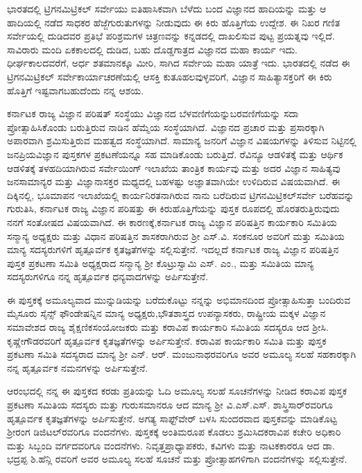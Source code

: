 ಭಾರತದಲ್ಲಿ ಟ್ರಿಗನಮಿಟ್ರಿಕಲ್​ ಸರ್ವೇಯು ಐತಿಹಾಸಿಕವಾಗಿ ಬೆಳೆದು ಬಂದ ವಿಜ್ಞಾನದ ಹಾದಿಯನ್ನು ಮತ್ತು ಆ ಹಾದಿಯಲ್ಲಿ ನಡೆದ ಸಾಧಕರ ಹೆಜ್ಜೆಗುರುತುಗಳನ್ನು ನೀಡುವುದು ಈ ಕಿರು ಹೊತ್ತಿಗೆಯ ಉದ್ದೇಶ. ಈ ನಿಖರ ಗಣಿತ ಸರ್ವೇಯಲ್ಲಿ ದುಡಿದವರ ಪ್ರತಿಭೆ ಪರಿಶ್ರಮಗಳ ಚಿತ್ರಣವನ್ನು ಕನ್ನಡದಲ್ಲಿ ದಾಖಲಿಸುವ ಪುಟ್ಟ ಪ್ರಯತ್ನವು ಇಲ್ಲಿದೆ. ಸಾವಿರಾರು ಮಂದಿ ಏಕಕಾಲದಲ್ಲಿ ದುಡಿದ, ಬಹು ದೊಡ್ಡಗಾತ್ರದ ವಿಜ್ಞಾನದ ಮಹಾ ಕಾರ್ಯ ಇದು. ಧೀರ್ಘ\-ಕಾಲದವರೆಗೆ, ಅರ್ಧ ಶತಮಾನಕ್ಕೂ ಮೀರಿ, ಸಾಗಿದ ಸರ್ವೇಯ ಮಹಾ ಯಾತ್ರೆ ಇದು. ಭಾರತದಲ್ಲಿ ನಡೆದ ಈ ಟ್ರಿಗನಮಿಟ್ರಿಕಲ್​ ಸರ್ವೇಕಾರ್ಯಾಚರಣೆಯಲ್ಲಿ ಆಸಕ್ತಿ ಕುತೂಹಲವುಳ್ಳವರಿಗೆ, ವಿಜ್ಞಾನ ಸಾಹಿತ್ಯಾಸಕ್ತರಿಗೆ ಈ ಕಿರು ಹೊತ್ತಿಗೆ ಇಷ್ಟವಾಗಬಹುದೆಂದು ನನ್ನ ಆಶಯ. 

ಕರ್ನಾಟಕ ರಾಜ್ಯ ವಿಜ್ಞಾನ ಪರಿಷತ್​ ಸಂಸ್ಥೆಯು ವಿಜ್ಞಾನದ ಬೆಳವಣಿಗೆಯನ್ನು\break ಬರವಣಿಗೆಯನ್ನು ಸದಾ ಪ್ರೋತ್ಸಾಹಿಸಿಕೊಂಡು ಬರುತ್ತಿರುವ ನಾಡಿನ ಹೆಮ್ಮೆಯ ಸಂಸ್ಥೆಯಾಗಿದೆ. ವಿಜ್ಞಾನದ ಪ್ರಚಾರ ಮತ್ತು ಪ್ರಸಾರಕ್ಕಾಗಿ ಅಪಾರವಾಗಿ ಶ್ರಮಿಸುತ್ತಿರುವ ಮಹತ್ವದ ಸಂಸ್ಥೆಯಾಗಿದೆ. ಸಾಮಾನ್ಯ ಜನರಿಗೆ ವಿಜ್ಞಾನ ವಿಷಯಗಳನ್ನು ತಿಳಿಸುವ ನಿಟ್ಟಿನಲ್ಲಿ ಜನಪ್ರಿಯ\break ವಿಜ್ಞಾನ ಪುಸ್ತಕಗಳ ಪ್ರಕಟಣೆಯನ್ನೂ ಸಹ ಮಾಡಿಕೊಂಡು ಬರುತ್ತಿದೆ. ರೆವಿನ್ಯೂ ಆಡಳಿತಕ್ಕೆ ಮತ್ತು ಆರ್ಥಿಕ ಆಡಳಿತಕ್ಕೆ ತಳಹದಿಯಾಗಿರುವ ಸರ್ವೇಯಿಂಗ್​ ಇಲಾಖೆಯ ತಾಂತ್ರಿಕ ಕಾರ್ಯವು ಮತ್ತು ಅದರ ವಿಜ್ಞಾನ ಸಾಹಿತ್ಯವು ಜನಸಾಮಾನ್ಯರ ಮತ್ತು ವಿಜ್ಞಾನಾಸಕ್ತರ ಮಧ್ಯದಲ್ಲಿ ಬಹಳಷ್ಟು ಅಜ್ಞಾತವಾಗಿಯೇ ಉಳಿದಿರುವ ವಿಷಯವಾಗಿದೆ. ಈ ದಿಕ್ಕಿನಲ್ಲಿ, ಭೂಮಾಪನ ಇಲಾಖೆಯಲ್ಲಿ ಕಾರ್ಯನಿರತನಾಗಿರುವ ನಾನು ಬರೆದಿರುವ ಟ್ರಿಗನಮಿಟ್ರಿಕಲ್​ ಸರ್ವೇ ಬರೆಹ\-ವನ್ನು ಗುರುತಿಸಿ, ಕರ್ನಾಟಕ ರಾಜ್ಯ ವಿಜ್ಞಾನ ಪರಿಷತ್ತು ಈ ಕಿರುಹೊತ್ತಿಗೆಯನ್ನು ಪುಸ್ತಕ ರೂಪ\-ದಲ್ಲಿ ಹೊರತರುತ್ತಿರುವುದು ನನಗೆ ಸಂತೋಷದ ವಿಷಯವಾಗಿದೆ. ಈ ಕಾರಣಕ್ಕೆ,\break ಕರ್ನಾಟಕ ರಾಜ್ಯ ವಿಜ್ಞಾನ ಪರಿಷತ್ತಿನ ಕಾರ್ಯಕಾರಿ ಸಮಿತಿಯ ಸನ್ಮಾನ್ಯ ಅಧ್ಯಕ್ಷರು ಮತ್ತು ವಿಧಾನ ಪರಿಷತ್ತಿನ ಶಾಸಕರಾಗಿರುವ ಶ‍್ರೀ ಎಸ್​.ವಿ. ಸಂಕನೂರ ಅವರಿಗೆ ಮತ್ತು ಸಮಿತಿಯ ಮಾನ್ಯ ಸದಸ್ಯರುಗಳಿಗೆ ಹೃತ್ಪೂರ್ವಕ ಕೃತಜ್ಞತೆಗಳನ್ನು ಸಲ್ಲಿಸುತ್ತೇನೆ. ಇದಲ್ಲದೆ ಕರ್ನಾಟಕ ರಾಜ್ಯ ವಿಜ್ಞಾನ ಪರಿಷತ್ತಿನ ಪುಸ್ತಕ ಪ್ರಕಟಣಾ ಸಮಿತಿ ಅಧ್ಯಕ್ಷರಾದ ಸನ್ಮಾನ್ಯ ಶ‍್ರೀ ಕೊಟ್ರು\-ಸ್ವಾಮಿ ಎಸ್​. ಎಂ., ಮತ್ತು ಸಮಿತಿಯ ಮಾನ್ಯ ಸದಸ್ಯರುಗಳಿಗೂ ನನ್ನ ಹೃತ್ಪೂರ್ವಕ ಧನ್ಯವಾದ\-ಗಳನ್ನು ಅರ್ಪಿಸುತ್ತೇನೆ.

ಈ ಪುಸ್ತಕಕ್ಕೆ ಅಮೂಲ್ಯವಾದ ಮುನ್ನುಡಿಯನ್ನು ಬರೆದುಕೊಟ್ಟು ನನ್ನನ್ನು ಅಭಿಮಾನದಿಂದ ಪ್ರೋತ್ಸಾಹಿಸುತ್ತಾ ಬಂದಿರುವ ಮೈಸೂರು ಸೈನ್ಸ್​ ಫೌಂಡೇಷನ್ನಿನ ಮಾನ್ಯ ಅಧ್ಯಕ್ಷರು,\break ಭೌತಶಾಸ್ತ್ರದ ಉಪನ್ಯಾಸಕರು, ರಾಷ್ಟ್ರೀಯ ಮಕ್ಕಳ ವಿಜ್ಞಾನ ಸಮಾವೇಶದ ರಾಜ್ಯ ಶೈಕ್ಷಣಿಕ\break ಸಂಯೋಜಕರು ಮತ್ತು ಕರಾವಿಪ ಕಾರ್ಯಕಾರಿ ಸಮಿತಿಯ ಸದಸ್ಯರೂ ಆದ ಶ‍್ರೀ\break ಸಿ. ಕೃಷ್ಣೇಗೌಡರವರಿಗೆ ಹೃತ್ಪೂರ್ವಕ ಕೃತಜ್ಞತೆಗಳನ್ನು ಅರ್ಪಿಸುತ್ತೇನೆ. ಕರಾವಿಪ ಕಾರ್ಯಕಾರಿ ಸಮಿತಿ ಮತ್ತು ಪುಸ್ತಕ ಪ್ರಕಟಣಾ ಸಮಿತಿ ಸದಸ್ಯರಾದ ಮಾನ್ಯ ಶ‍್ರೀ ಎನ್​. ಆರ್​. ಮಂಜುನಾಥ\-ರವರಿಗೂ ಅವರ ಅಮೂಲ್ಯ ಸಲಹೆ ಸಹಕಾರಕ್ಕಾಗಿ ನನ್ನ ಹೃತ್ಪೂರ್ವಕ ನಮನಗಳನ್ನು ಅರ್ಪಿಸುತ್ತೇನೆ.

ಆರಂಭದಲ್ಲಿ ನನ್ನ ಈ ಪುಸ್ತಕದ ಕರಡು ಪ್ರತಿಯನ್ನು ಓದಿ ಅಮೂಲ್ಯ ಸಲಹೆ ಸೂಚನೆ\-ಗಳನ್ನು ನೀಡಿದ ಕರಾವಿಪ ಪುಸ್ತಕ ಪ್ರಕಟಣಾ ಸಮಿತಿಯ ಸದಸ್ಯರು ಮತ್ತು ಗುರು\break ಸಮಾನರೂ ಆದ ಮಾನ್ಯ ಶ‍್ರೀ ವಿ.ಎಸ್​.ಎಸ್​. ಶಾಸ್ತ್ರಿಸಾರ್​ರವರಿಗೂ ಹೃತ್ಪೂರ್ವಕ ಕೃತಜ್ಞತೆಗಳನ್ನು ಅರ್ಪಿಸುತ್ತೇನೆ. ಅಗತ್ಯ ಸಾಫ್ಟ್​ವೇರ್​ ಬಳಸಿ ಸುಂದರವಾದ ಪುಸ್ತಕವನ್ನು ಮಾಡಿಕೊಟ್ಟ ಶ‍್ರೀರಂಗ ಡಿಜಿಟಲ್​ರವರಿಗೂ ವಂದನೆಗಳು. ಪುಸ್ತಕಕ್ಕೆ ಅಂತಿಮರೂಪ ಕೊಡಲು ಶ್ರಮಿಸಿದ\break ಕರಾವಿಪ ಕಚೇರಿ ಅಧಿಕಾರಿ ಮತ್ತು ಸಿಬ್ಬಂದಿ ವರ್ಗದವರಿಗೂ ವಂದನೆಗಳು. ನಿವೃತ್ತ\break ಪ್ರಾಧ್ಯಾಪಕರು, ಕವಿಗಳು ಮತ್ತು ನಾಟಕಕಾರರೂ ಆದ ಡಾ. ಭದ್ರಪ್ಪ ಶಿ.ಹೆನ್ಲಿ ರವರಿಗೆ ಅವರ ಅಮೂಲ್ಯ ಸಲಹೆ ಸೂಚನೆ ಮತ್ತು ಪ್ರೋತ್ಸಾಹಗಳಿಗಾಗಿ ವಂದನೆಗಳನ್ನು ಸಲ್ಲಿಸುತ್ತೇನೆ.

